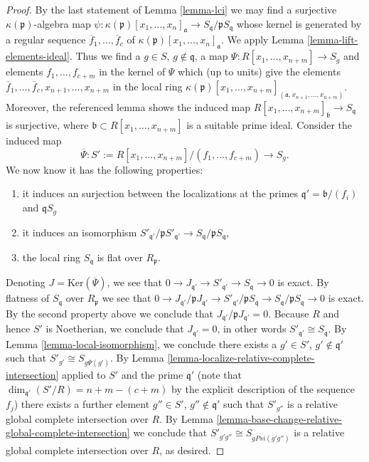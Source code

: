 \begin{proof}
\medskip\noindent
By the last statement of Lemma \ref{lemma-lci}
we may find a surjective $\kappa(\mathfrak p)$-algebra map
$\psi : \kappa(\mathfrak p)[x_1, \ldots, x_n]_{\mathfrak a}
\to S_{\mathfrak q}/\mathfrak pS_{\mathfrak q}$ whose
kernel is generated by a regular sequence
$\overline{f}_1, \ldots, \overline{f}_c$ of
$\kappa(\mathfrak p)[x_1, \ldots, x_n]_{\mathfrak a}$.
We apply Lemma \ref{lemma-lift-elements-ideal}.
Thus we find a $g \in S$, $g \not \in \mathfrak q$,
a map $\Psi : R[x_1, \ldots, x_{n + m}] \to S_g$
and elements $f_1, \ldots, f_{c + m}$ in the kernel
of $\Psi$ which (up to units) give the elements
$\overline{f}_1, \ldots, \overline{f}_c, x_{n + 1}, \ldots, x_{n + m}$
in the local ring
$\kappa(\mathfrak p)[x_1, \ldots, x_{n + m}]_{
(\mathfrak a, x_{n + 1}, \ldots, x_{n + m})}$.
Moreover, the referenced lemma shows the induced map
$R[x_1, \ldots, x_{n + m}]_{\mathfrak b} \to S_{\mathfrak q}$
is surjective, where $\mathfrak b \subset R[x_1, \ldots, x_{n + m}]$
is a suitable prime ideal. Consider the induced map
$$
\overline{\Psi} :
S' := R[x_1, \ldots, x_{n + m}]/(f_1, \ldots, f_{c + m})
\longrightarrow
S_g.
$$
We now know it has the following properties:
\begin{enumerate}
\item it induces an surjection between the localizations
at the primes $\mathfrak q' = \mathfrak b/(f_i)$ and $\mathfrak qS_g$
\item it induces an isomorphism
$S'_{\mathfrak q'}/\mathfrak pS'_{\mathfrak q'} \to
S_{\mathfrak q}/\mathfrak p S_{\mathfrak q}$,
\item the local ring $S_{\mathfrak q}$ is flat over $R_{\mathfrak p}$.
\end{enumerate}
Denoting $J = \text{Ker}(\overline{\Psi})$, we see that
$0 \to J_{\mathfrak q'} \to S'_{\mathfrak q'} \to S_{\mathfrak q} \to 0$
is exact. By flatness of $S_{\mathfrak q}$ over $R_{\mathfrak p}$
we see that
$0 \to
J_{\mathfrak q'}/\mathfrak pJ_{\mathfrak q'} \to
S'_{\mathfrak q'}/\mathfrak p S_{\mathfrak q}\to
S_{\mathfrak q}/\mathfrak pS_{\mathfrak q} \to 0$
is exact. By the second property above we conclude that
$J_{\mathfrak q'}/\mathfrak pJ_{\mathfrak q'} = 0$.
Because $R$ and hence $S'$ is Noetherian, we conclude
that $J_{\mathfrak q'} = 0$, in other words
$S'_{\mathfrak q'} \cong S_{\mathfrak q}$.
By Lemma \ref{lemma-local-isomorphism}, we conclude there exists
a $g' \in S'$, $g' \not \in \mathfrak q'$
such that $S'_{g'} \cong S_{g\overline{\Psi}(g')}$.
By Lemma \ref{lemma-localize-relative-complete-intersection}
applied to $S'$ and the prime $\mathfrak q'$ (note that
$\dim_{\mathfrak q'}(S'/R) = n + m - (c + m)$ by the
explicit description of the sequence $f_j$) there exists
a further element $g'' \in S'$, $g'' \not \in \mathfrak q'$
such that $S'_{g''}$ is a relative global complete intersection
over $R$. By
Lemma \ref{lemma-base-change-relative-global-complete-intersection}
we conclude that $S'_{g'g''} \cong S_{g\overline{Psi}(g'g'')}$
is a relative global complete intersection over $R$, as desired.
\end{proof}

